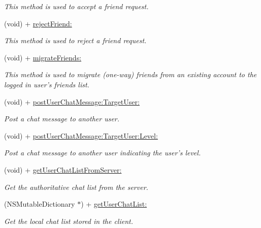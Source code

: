 \begin{DoxyCompactItemize}
\begin{DoxyCompactList}\small\item\em This method is used to accept a friend request. \end{DoxyCompactList}\item 
(void) + \hyperlink{interface_fuse_a_p_i_a8af1416799fd2922db49ed1de406f537}{reject\+Friend\+:}
\begin{DoxyCompactList}\small\item\em This method is used to reject a friend request. \end{DoxyCompactList}\item 
(void) + \hyperlink{interface_fuse_a_p_i_a199e36abe741ecdf8062d1afddc6e146}{migrate\+Friends\+:}
\begin{DoxyCompactList}\small\item\em This method is used to migrate (one-\/way) friends from an existing account to the logged in user's friends list. \end{DoxyCompactList}\item 
(void) + \hyperlink{interface_fuse_a_p_i_a604c0c2eeaf0176e358ff5b35f7c3db3}{post\+User\+Chat\+Message\+:\+Target\+User\+:}
\begin{DoxyCompactList}\small\item\em Post a chat message to another user. \end{DoxyCompactList}\item 
(void) + \hyperlink{interface_fuse_a_p_i_a3c384e70f2e16d9b12ba723b17dad9c8}{post\+User\+Chat\+Message\+:\+Target\+User\+:\+Level\+:}
\begin{DoxyCompactList}\small\item\em Post a chat message to another user indicating the user's level. \end{DoxyCompactList}\item 
(void) + \hyperlink{interface_fuse_a_p_i_ac27a75ba0171e2bd397cc2e5ce1de159}{get\+User\+Chat\+List\+From\+Server\+:}
\begin{DoxyCompactList}\small\item\em Get the authoritative chat list from the server. \end{DoxyCompactList}\item 
(N\+S\+Mutable\+Dictionary $\ast$) + \hyperlink{interface_fuse_a_p_i_adac2a3d729e698c0325912d8126b8268}{get\+User\+Chat\+List\+:}
\begin{DoxyCompactList}\small\item\em Get the local chat list stored in the client. \end{DoxyCompactList}\item 

\end{DoxyCompactItemize}
